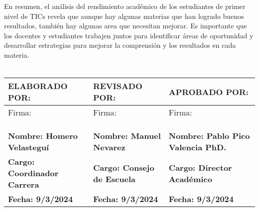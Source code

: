 En resumen, el análisis del rendimiento académico de los estudiantes de primer nivel de TICs revela que aunque hay algunas materias que han logrado buenos resultados, también hay algunas area que necesitan mejorar. Es importante que los docentes y estudiantes trabajen juntos para identificar áreas de oportunidad y desarrollar estrategias para mejorar la comprensión y los resultados en cada materia.\\
\vspace{1cm}\\\begin{tabularx}{\textwidth}{|X|X|X|}
    \hline
    \textbf{ELABORADO POR:} & \textbf{REVISADO POR:} & \textbf{APROBADO POR:} \\ \hline
    Firma: & Firma: & Firma:\\
    &&\\
    &&\\
    &&\\ \hline
    \textbf{Nombre: Homero Velasteguí} & \textbf{Nombre: Manuel Nevarez} & \textbf{Nombre: Pablo Pico Valencia PhD.} \\ \hline
    \textbf{Cargo: Coordinador Carrera} & \textbf{Cargo: Consejo de Escuela} & \textbf{Cargo: Director Académico} \\ \hline
    \textbf{Fecha: 9/3/2024} & \textbf{Fecha: 9/3/2024} & \textbf{Fecha: 9/3/2024} \\ \hline
    \end{tabularx}
